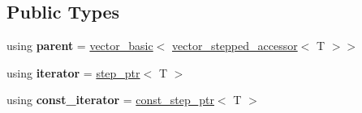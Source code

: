 \subsection*{Public Types}
\begin{DoxyCompactItemize}
\item 
using {\bfseries parent} = \hyperlink{classmalgo_1_1vector__basic}{vector\+\_\+basic}$<$ \hyperlink{classmalgo_1_1vector__stepped__accessor}{vector\+\_\+stepped\+\_\+accessor}$<$ T $>$$>$\hypertarget{classmalgo_1_1vector__stepped__accessor_ac26bb6a426d51acf68a4fefb37a4ed47}{}\label{classmalgo_1_1vector__stepped__accessor_ac26bb6a426d51acf68a4fefb37a4ed47}

\item 
using {\bfseries iterator} = \hyperlink{structmalgo_1_1step__ptr}{step\+\_\+ptr}$<$ T $>$\hypertarget{classmalgo_1_1vector__stepped__accessor_ac08cca8844487f98be943f3471dafa20}{}\label{classmalgo_1_1vector__stepped__accessor_ac08cca8844487f98be943f3471dafa20}

\item 
using {\bfseries const\+\_\+iterator} = \hyperlink{structmalgo_1_1const__step__ptr}{const\+\_\+step\+\_\+ptr}$<$ T $>$\hypertarget{classmalgo_1_1vector__stepped__accessor_abfe15bbe52e977409b03c1baae153600}{}\label{classmalgo_1_1vector__stepped__accessor_abfe15bbe52e977409b03c1baae153600}

\end{DoxyCompactItemize}
